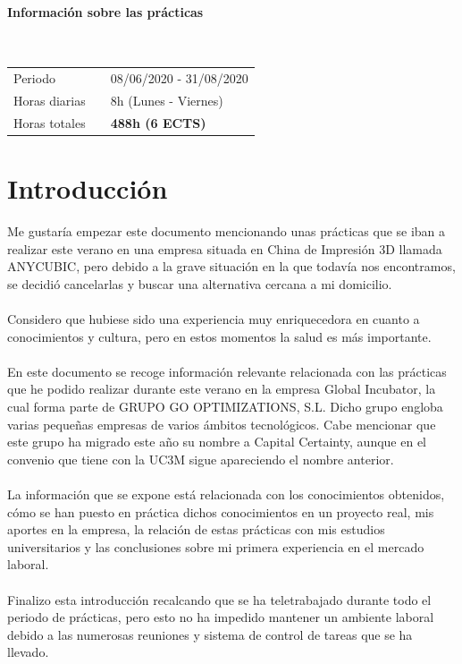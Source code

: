 \documentclass[a4paper,12pt]{article}
\begin{document}
\paragraph{Información sobre las prácticas}\mbox{}\\
\begin{table}[H]
\begin{tabular}{@{}lll@{}}
Periodo &  \mbox{\phantom{dwdwdwdw}}                                  & 08/06/2020 - 31/08/2020 \\
Horas diarias &   \mbox{\phantom{dwdwdwdw}}                               & 8h (Lunes - Viernes)
\\
Horas totales &  \mbox{\phantom{dwdwdwdw}}                                 & \textbf{488h (6 ECTS)}    
\\
\end{tabular}
\end{table}

\newpage

\section{Introducción}

Me gustaría empezar este documento mencionando unas prácticas que se iban a realizar este verano en una empresa situada en China de Impresión 3D llamada ANYCUBIC, pero debido a la grave situación en la que todavía nos encontramos, se decidió cancelarlas y buscar una alternativa cercana a mi domicilio. \\
\\
Considero que hubiese sido una experiencia muy enriquecedora en cuanto a conocimientos y cultura, pero en estos momentos la salud es más importante.\\
\\
En este documento se recoge información relevante relacionada con las prácticas que he podido realizar durante este verano en la empresa Global Incubator, la cual forma parte de GRUPO GO OPTIMIZATIONS, S.L. Dicho grupo engloba varias pequeñas empresas de varios ámbitos tecnológicos. Cabe mencionar que este grupo ha migrado este año su nombre a Capital Certainty, aunque en el convenio que tiene con la UC3M sigue apareciendo el nombre anterior.\\
\\
La información que se expone está relacionada con los conocimientos obtenidos, cómo se han puesto en práctica dichos conocimientos en un proyecto real, mis aportes en la empresa, la relación de estas prácticas con mis estudios universitarios y las conclusiones sobre mi primera experiencia en el mercado laboral.\\
\\
Finalizo esta introducción recalcando que se ha teletrabajado durante todo el periodo de prácticas, pero esto no ha impedido mantener un ambiente laboral debido a las numerosas reuniones y sistema de control de tareas que se ha llevado.\\
\end{document}
